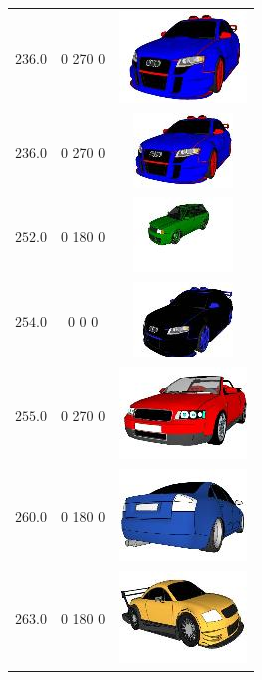 \begin{longtable}{ccc}
	$236.0$ & 0 270 0 & \includegraphics{models/763d8d2e0ddf5d9238b6d28982ae3a2f.jpg}\\
	$236.0$ & 0 270 0 & \includegraphics{models/7ac7379295a4d107ee3ed3d25015cf74.jpg}\\
	$252.0$ & 0 180 0 & \includegraphics{models/b771888c818cf228ae1ad318e27ccdba.jpg}\\
	$254.0$ & 0 0 0 & \includegraphics{models/559debaf2a6f05f5b11647ffa4306609.jpg}\\
	$255.0$ & 0 270 0 & \includegraphics{models/642b25bf439de00b8e44a8372bbc7e32.jpg}\\
	$260.0$ & 0 180 0 & \includegraphics{models/db88d4c4bb27bfb095dd764ac5d0d0bc.jpg}\\
	$263.0$ & 0 180 0 & \includegraphics{models/2b68066726401ec8a8443d62c3df7ce4.jpg}\\

\end{longtable}
